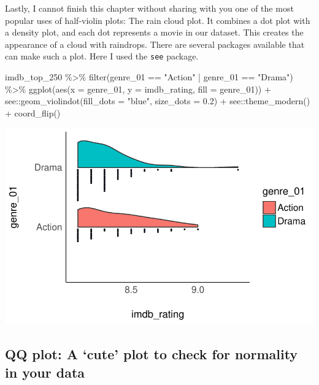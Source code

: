 \documentclass[
  letterpaper,
]{krantz}
\makeatletter
\newenvironment{Shaded}{\begin{snugshade}}{\end{snugshade}}
\newcommand{\AttributeTok}[1]{\textcolor[rgb]{0.40,0.45,0.13}{#1}}
\newcommand{\FloatTok}[1]{\textcolor[rgb]{0.68,0.00,0.00}{#1}}
\newcommand{\FunctionTok}[1]{\textcolor[rgb]{0.28,0.35,0.67}{#1}}
\newcommand{\NormalTok}[1]{\textcolor[rgb]{0.00,0.23,0.31}{#1}}
\newcommand{\SpecialCharTok}[1]{\textcolor[rgb]{0.37,0.37,0.37}{#1}}
\newcommand{\StringTok}[1]{\textcolor[rgb]{0.13,0.47,0.30}{#1}}
\newenvironment{kframe}{%
\medskip{}
\setlength{\fboxsep}{.8em}
 \def\at@end@of@kframe{}%
 \ifinner\ifhmode%
  \def\at@end@of@kframe{\end{minipage}}%
  \begin{minipage}{\columnwidth}%
 \fi\fi%
 \def\FrameCommand##1{\hskip\@totalleftmargin \hskip-\fboxsep
 \colorbox{shadecolor}{##1}\hskip-\fboxsep
     \hskip-\linewidth \hskip-\@totalleftmargin \hskip\columnwidth}%
 \MakeFramed {\advance\hsize-\width
   \@totalleftmargin\z@ \linewidth\hsize
   \@setminipage}}%
 {\par\unskip\endMakeFramed%
 \at@end@of@kframe}
\renewenvironment{Shaded}{\begin{kframe}}{\end{kframe}}
\makeatother
\begin{document}
Lastly, I cannot finish this chapter without sharing with you one of the
most popular uses of half-violin plots: The rain cloud plot. It combines
a dot plot with a density plot, and each dot represents a movie in our
dataset. This creates the appearance of a cloud with raindrops. There
are several packages available that can make such a plot. Here I used
the \texttt{see} package.

\begin{Shaded}
\begin{Highlighting}[]
\NormalTok{imdb\_top\_250 }\SpecialCharTok{\%\textgreater{}\%}
  \FunctionTok{filter}\NormalTok{(genre\_01 }\SpecialCharTok{==} \StringTok{"Action"} \SpecialCharTok{|}\NormalTok{ genre\_01 }\SpecialCharTok{==} \StringTok{"Drama"}\NormalTok{) }\SpecialCharTok{\%\textgreater{}\%}
  \FunctionTok{ggplot}\NormalTok{(}\FunctionTok{aes}\NormalTok{(}\AttributeTok{x =}\NormalTok{ genre\_01, }\AttributeTok{y =}\NormalTok{ imdb\_rating, }\AttributeTok{fill =}\NormalTok{ genre\_01)) }\SpecialCharTok{+}
\NormalTok{  see}\SpecialCharTok{::}\FunctionTok{geom\_violindot}\NormalTok{(}\AttributeTok{fill\_dots =} \StringTok{"blue"}\NormalTok{, }\AttributeTok{size\_dots =} \FloatTok{0.2}\NormalTok{) }\SpecialCharTok{+}
\NormalTok{  see}\SpecialCharTok{::}\FunctionTok{theme\_modern}\NormalTok{() }\SpecialCharTok{+}
  \FunctionTok{coord\_flip}\NormalTok{()}
\end{Highlighting}
\end{Shaded}

\includegraphics{08_descriptive_statistics_files/figure-pdf/rain-cloud-plot-1.pdf}

\subsection{QQ plot: A `cute' plot to check for normality in your
data}\label{qq-plot}
\end{document}
